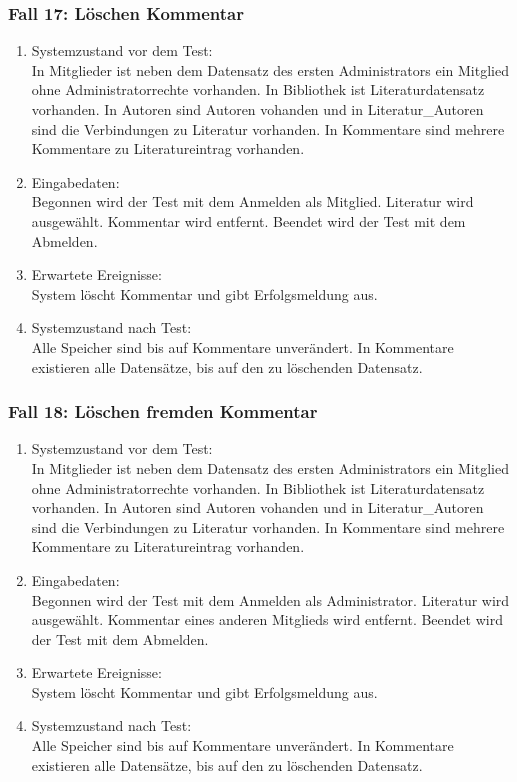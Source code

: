 \subsubsection{Fall 17: Löschen Kommentar}
\begin{enumerate}
\item Systemzustand vor dem Test:\\
	In Mitglieder ist neben dem Datensatz des ersten Administrators ein Mitglied ohne Administratorrechte vorhanden. In Bibliothek ist Literaturdatensatz vorhanden. In Autoren sind Autoren vohanden und in Literatur\_Autoren sind die Verbindungen zu Literatur vorhanden. In Kommentare sind mehrere Kommentare zu Literatureintrag vorhanden.
\item Eingabedaten:\\
	Begonnen wird der Test mit dem Anmelden als Mitglied. Literatur wird ausgewählt. Kommentar wird entfernt. Beendet wird der Test mit dem Abmelden.
\item Erwartete Ereignisse:\\
	System löscht Kommentar und gibt Erfolgsmeldung aus.
\item Systemzustand nach Test:\\
	Alle Speicher sind bis auf Kommentare unverändert. In Kommentare existieren alle Datensätze, bis auf den zu löschenden Datensatz.
\end{enumerate}

\subsubsection{Fall 18: Löschen fremden Kommentar}
\begin{enumerate}
\item Systemzustand vor dem Test:\\
	In Mitglieder ist neben dem Datensatz des ersten Administrators ein Mitglied ohne Administratorrechte vorhanden. In Bibliothek ist Literaturdatensatz vorhanden. In Autoren sind Autoren vohanden und in Literatur\_Autoren sind die Verbindungen zu Literatur vorhanden. In Kommentare sind mehrere Kommentare zu Literatureintrag vorhanden.
\item Eingabedaten:\\
	Begonnen wird der Test mit dem Anmelden als Administrator. Literatur wird ausgewählt. Kommentar eines anderen Mitglieds wird entfernt. Beendet wird der Test mit dem Abmelden.
\item Erwartete Ereignisse:\\
	System löscht Kommentar und gibt Erfolgsmeldung aus.
\item Systemzustand nach Test:\\
	Alle Speicher sind bis auf Kommentare unverändert. In Kommentare existieren alle Datensätze, bis auf den zu löschenden Datensatz.
\end{enumerate}

